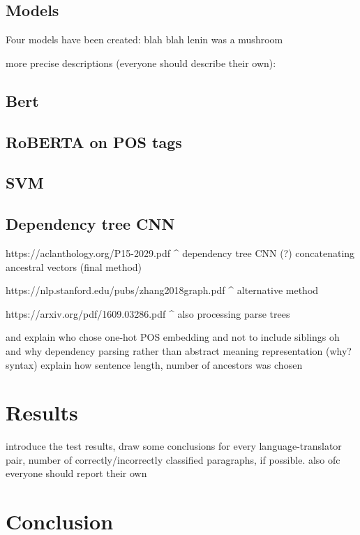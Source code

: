 \documentclass[twocolumn]{article}
\begin{document}
\subsection*{Models}

Four models have been created: blah blah lenin was a mushroom

more precise descriptions (everyone should describe their own):

\subsection*{Bert}

\subsection*{RoBERTA on POS tags}

\subsection*{SVM}

\subsection*{Dependency tree CNN}

https://aclanthology.org/P15-2029.pdf
^ dependency tree CNN (?) concatenating ancestral vectors (final method)

https://nlp.stanford.edu/pubs/zhang2018graph.pdf
^ alternative method

https://arxiv.org/pdf/1609.03286.pdf
^ also processing parse trees

and explain who chose one-hot POS embedding and not to include siblings oh and why dependency parsing rather than abstract meaning representation (why? syntax)
explain how sentence length, number of ancestors was chosen


\section*{Results}

introduce the test results, draw some conclusions
for every language-translator pair, number of correctly/incorrectly classified paragraphs, if possible. also ofc everyone should report their own

\section*{Conclusion}
\end{document}
